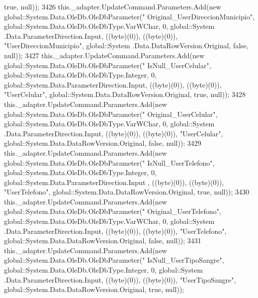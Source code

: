\begin{DoxyCode}
       \textcolor{keyword}{true}, null));
3426             this.\_adapter.UpdateCommand.Parameters.Add(\textcolor{keyword}{new} global::System.Data.OleDb.OleDbParameter(\textcolor{stringliteral}{"
      Original\_UserDireccionMunicipio"}, global::System.Data.OleDb.OleDbType.VarWChar, 0, global::System
      .Data.ParameterDirection.Input, ((byte)(0)), ((byte)(0)), \textcolor{stringliteral}{"UserDireccionMunicipio"}, global::System
      .Data.DataRowVersion.Original, \textcolor{keyword}{false}, null));
3427             this.\_adapter.UpdateCommand.Parameters.Add(\textcolor{keyword}{new} global::System.Data.OleDb.OleDbParameter(\textcolor{stringliteral}{"
      IsNull\_UserCelular"}, global::System.Data.OleDb.OleDbType.Integer, 0, global::System.Data.ParameterDirection.Input,
       ((byte)(0)), ((byte)(0)), \textcolor{stringliteral}{"UserCelular"}, global::System.Data.DataRowVersion.Original, \textcolor{keyword}{true}, null));
3428             this.\_adapter.UpdateCommand.Parameters.Add(\textcolor{keyword}{new} global::System.Data.OleDb.OleDbParameter(\textcolor{stringliteral}{"
      Original\_UserCelular"}, global::System.Data.OleDb.OleDbType.VarWChar, 0, global::System
      .Data.ParameterDirection.Input, ((byte)(0)), ((byte)(0)), \textcolor{stringliteral}{"UserCelular"}, global::System.Data.DataRowVersion.Original, \textcolor{keyword}{false}, null));
3429             this.\_adapter.UpdateCommand.Parameters.Add(\textcolor{keyword}{new} global::System.Data.OleDb.OleDbParameter(\textcolor{stringliteral}{"
      IsNull\_UserTelefono"}, global::System.Data.OleDb.OleDbType.Integer, 0, global::System.Data.ParameterDirection.Input
      , ((byte)(0)), ((byte)(0)), \textcolor{stringliteral}{"UserTelefono"}, global::System.Data.DataRowVersion.Original, \textcolor{keyword}{true}, null));
3430             this.\_adapter.UpdateCommand.Parameters.Add(\textcolor{keyword}{new} global::System.Data.OleDb.OleDbParameter(\textcolor{stringliteral}{"
      Original\_UserTelefono"}, global::System.Data.OleDb.OleDbType.VarWChar, 0, global::System
      .Data.ParameterDirection.Input, ((byte)(0)), ((byte)(0)), \textcolor{stringliteral}{"UserTelefono"}, global::System.Data.DataRowVersion.Original, \textcolor{keyword}{false}, null));
3431             this.\_adapter.UpdateCommand.Parameters.Add(\textcolor{keyword}{new} global::System.Data.OleDb.OleDbParameter(\textcolor{stringliteral}{"
      IsNull\_UserTipoSangre"}, global::System.Data.OleDb.OleDbType.Integer, 0, global::System
      .Data.ParameterDirection.Input, ((byte)(0)), ((byte)(0)), \textcolor{stringliteral}{"UserTipoSangre"}, global::System.Data.DataRowVersion.Original, \textcolor{keyword}{true}, null));

\end{DoxyCode}
